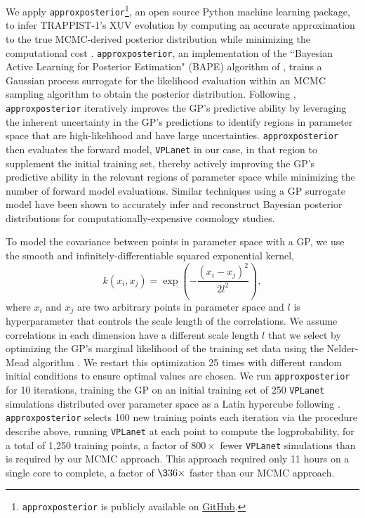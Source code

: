 \documentclass[twocolumn]{aastex62}
\newcommand{\vplanet}[0]{\texttt{VPLanet}\xspace}
\newcommand{\approxposterior}[0]{\texttt{approxposterior}\xspace}
\begin{document}
We apply \approxposterior\footnote{\approxposterior is publicly available on \href{https://github.com/dflemin3/approxposterior}{GitHub}.}, an open source Python machine learning package, to infer TRAPPIST-1's XUV evolution by computing an accurate approximation to the true MCMC-derived posterior distribution while minimizing the computational cost \citep{FlemingVanderPlas2018}. \approxposterior, an implementation of the ``Bayesian Active Learning for Posterior Estimation" (BAPE) algorithm of \citet{Kandasamy2015}, trains a Gaussian process \citep[GP, ][]{Rasmussen2006} surrogate for the likelihood evaluation within an MCMC sampling algorithm to obtain the posterior distribution. Following \citet{Kandasamy2015}, \approxposterior iteratively improves the GP's predictive ability by leveraging the inherent uncertainty in the GP's predictions to identify regions in parameter space that are high-likelihood and have large uncertainties. \approxposterior then evaluates the forward model, \vplanet in our case, in that region to supplement the initial training set, thereby actively improving the GP's predictive ability in the relevant regions of parameter space while minimizing the number of forward model evaluations. Similar techniques using a GP surrogate model have been shown to accurately infer \citep[e.g.][]{Bird2019,Rogers2019,Takhtaganov2019} and reconstruct \citep{McClintock2019} Bayesian posterior distributions for computationally-expensive cosmology studies.

To model the covariance between points in parameter space with a GP, we use the smooth and infinitely-differentiable squared exponential kernel,
\begin{equation} \label{eqn:kernel}
k(x_i, x_j) = \exp \left( - \frac{(x_i - x_j)^2}{2l^2} \right),
\end{equation}
where $x_i$ and $x_j$ are two arbitrary points in parameter space and $l$ is hyperparameter that controls the scale length of the correlations. We assume correlations in each dimension have a different scale length $l$ that we select by optimizing the GP's marginal likelihood of the training set data using the Nelder-Mead algorithm \citep{Nelder1965}. We restart this optimization 25 times with different random initial conditions to ensure optimal values are chosen. We run \approxposterior for 10 iterations, training the GP on an initial training set of 250 \vplanet simulations distributed over parameter space as a Latin hypercube following \citet{Bird2019}. \approxposterior selects 100 new training points each iteration via the procedure describe above, running \vplanet at each point to compute the logprobability, for a total of 1,250 training points, a factor of $800\times$ fewer \vplanet simulations than is required by our MCMC approach. This approach required only 11 hours on a single core to complete, a factor of $\336\times$ faster than our MCMC approach. 
\end{document}
